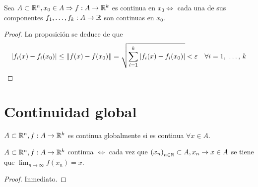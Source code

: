 \begin{prop}
  Sea \(A \subset \mathbb{R}^n, x_0 \in A \Rightarrow f: A \to \mathbb{R}^k\) es continua en \(x_0 \iff \) cada una de sus componentes \(f_1, \ldots, f_k: A \to \mathbb{R} \) son continuas en \(x_0\).
  \begin{proof}
    La proposición se deduce de que\begin{align*}
      |f_i(x) - f_i(x_0)| \leq \| f(x) - f(x_0) \| = \sqrt{ \sum_{i = 1}^k |f_i(x) - f_i(x_0)| } < \varepsilon \quad \forall i = 1\text{, }\ldots\text{, }k
    \end{align*}
  \end{proof}
\end{prop}

\section{Continuidad global}

\begin{definition}
  \(A \subset \mathbb{R}^n, f: A \to \mathbb{R}^k\) es continua globalmente si es continua \(\forall x \in A\).
\end{definition}

\begin{prop}
  \(A \subset \mathbb{R}^n, f: A \to \mathbb{R}^k\) continua \(\iff \) cada vez que \({(x_n)}_{n \in \mathbb{N}} \subset A, x_n \to x \in A\) se tiene que \(\lim_{n \to \infty} f(x_n) = x\).
  \begin{proof}
    Inmediato.
  \end{proof}
\end{prop}

\clearpage

